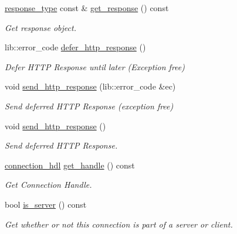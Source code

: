 \begin{DoxyCompactItemize}
\mbox{\hyperlink{classwebsocketpp_1_1http_1_1parser_1_1response}{response\+\_\+type}} const  \& \mbox{\hyperlink{classwebsocketpp_1_1connection_afe112802e0cce33907f513bb9e0cce19}{get\+\_\+response}} () const
\begin{DoxyCompactList}\small\item\em Get response object. \end{DoxyCompactList}\item 
lib\+::error\+\_\+code \mbox{\hyperlink{classwebsocketpp_1_1connection_a32c3f964cef870faf0d8f23c5b7588bb}{defer\+\_\+http\+\_\+response}} ()
\begin{DoxyCompactList}\small\item\em Defer H\+T\+TP Response until later (Exception free) \end{DoxyCompactList}\item 
void \mbox{\hyperlink{classwebsocketpp_1_1connection_a6c192eb26aa8be9afed7ff9e85990ea8}{send\+\_\+http\+\_\+response}} (lib\+::error\+\_\+code \&ec)
\begin{DoxyCompactList}\small\item\em Send deferred H\+T\+TP Response (exception free) \end{DoxyCompactList}\item 
\mbox{\label{classwebsocketpp_1_1connection_aabc8c4f01bb9fd6336e536d992ae1a4f}} 
void \mbox{\hyperlink{classwebsocketpp_1_1connection_aabc8c4f01bb9fd6336e536d992ae1a4f}{send\+\_\+http\+\_\+response}} ()
\begin{DoxyCompactList}\small\item\em Send deferred H\+T\+TP Response. \end{DoxyCompactList}\item 
\mbox{\hyperlink{namespacewebsocketpp_a6b3d26a10ee7229b84b776786332631d}{connection\+\_\+hdl}} \mbox{\hyperlink{classwebsocketpp_1_1connection_a6a28147e2f3f4c1fb37f29a234e772bc}{get\+\_\+handle}} () const
\begin{DoxyCompactList}\small\item\em Get Connection Handle. \end{DoxyCompactList}\item 
bool \mbox{\hyperlink{classwebsocketpp_1_1connection_ab248ee632b5b4d9998fec4328510f445}{is\+\_\+server}} () const
\begin{DoxyCompactList}\small\item\em Get whether or not this connection is part of a server or client. \end{DoxyCompactList}\item 

\end{DoxyCompactItemize}
